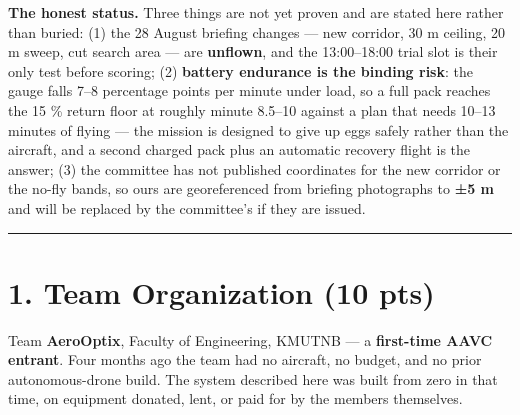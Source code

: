 \documentclass[
  10pt,
  a4paper,
  titlepage]{article}
\begin{document}
\textbf{The honest status.} Three things are not yet proven and are
stated here rather than buried: (1) the 28 August briefing changes ---
new corridor, 30 m ceiling, 20 m sweep, cut search area --- are
\textbf{unflown}, and the 13:00--18:00 trial slot is their only test
before scoring; (2) \textbf{battery endurance is the binding risk}: the
gauge falls 7--8 percentage points per minute under load, so a full pack
reaches the 15 \% return floor at roughly minute 8.5--10 against a plan
that needs 10--13 minutes of flying --- the mission is designed to give
up eggs safely rather than the aircraft, and a second charged pack plus
an automatic recovery flight is the answer; (3) the committee has not
published coordinates for the new corridor or the no-fly bands, so ours
are georeferenced from briefing photographs to \textbf{±5 m} and will be
replaced by the committee's if they are issued.

\begin{center}\rule{0.5\linewidth}{0.5pt}\end{center}

\hypertarget{team-organization-10-pts}{%
\section{1. Team Organization (10 pts)}\label{team-organization-10-pts}}

Team \textbf{AeroOptix}, Faculty of Engineering, KMUTNB --- a
\textbf{first-time AAVC entrant}. Four months ago the team had no
aircraft, no budget, and no prior autonomous-drone build. The system
described here was built from zero in that time, on equipment donated,
lent, or paid for by the members themselves.
\end{document}

